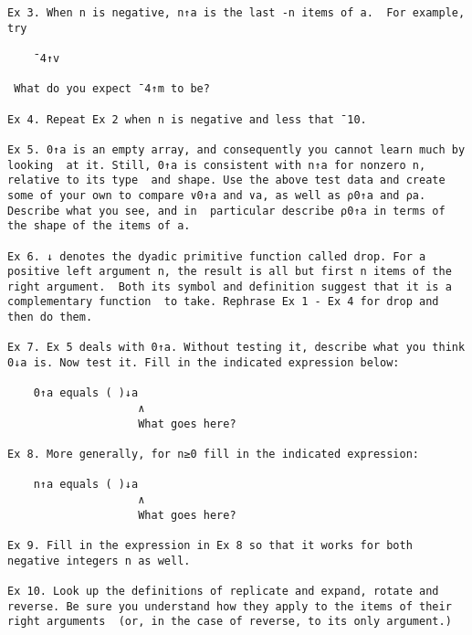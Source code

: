 \documentclass{article}
\begin{document}
\begin{verbatim}
Ex 3. When n is negative, n↑a is the last -n items of a.  For example,
try                                                                   

	¯4↑v                                                                 

 What do you expect ¯4↑m to be?                                       

Ex 4. Repeat Ex 2 when n is negative and less that ¯10.               

Ex 5. 0↑a is an empty array, and consequently you cannot learn much by
looking  at it. Still, 0↑a is consistent with n↑a for nonzero n,      
relative to its type  and shape. Use the above test data and create   
some of your own to compare ∨0↑a and ∨a, as well as ⍴0↑a and ⍴a.      
Describe what you see, and in  particular describe ⍴0↑a in terms of   
the shape of the items of a.                                          

Ex 6. ↓ denotes the dyadic primitive function called drop. For a      
positive left argument n, the result is all but first n items of the  
right argument.  Both its symbol and definition suggest that it is a  
complementary function  to take. Rephrase Ex 1 - Ex 4 for drop and    
then do them.                                                         

Ex 7. Ex 5 deals with 0↑a. Without testing it, describe what you think
0↓a is. Now test it. Fill in the indicated expression below:          

	0↑a equals ( )↓a                                                     
                    ∧                                                  
                    What goes here?                                    

Ex 8. More generally, for n≥0 fill in the indicated expression:       

	n↑a equals ( )↓a                                                     
                    ∧                                                  
                    What goes here?                                    

Ex 9. Fill in the expression in Ex 8 so that it works for both        
negative integers n as well.                                          

Ex 10. Look up the definitions of replicate and expand, rotate and    
reverse. Be sure you understand how they apply to the items of their  
right arguments  (or, in the case of reverse, to its only argument.)  


\end{verbatim}
\end{document}
